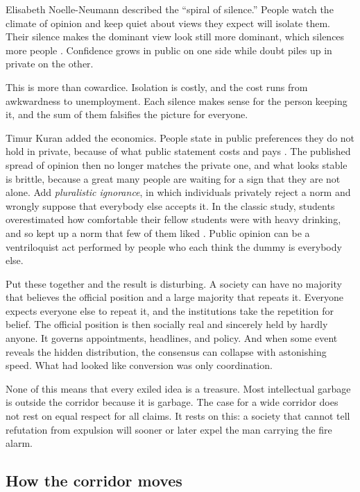 \documentclass[12pt,a4paper]{book}
\begin{document}
Elisabeth Noelle-Neumann described the ``spiral of silence.'' People watch the climate of opinion and keep quiet about views they expect will isolate them. Their silence makes the dominant view look still more dominant, which silences more people \cite{Noelle-Neumann}. Confidence grows in public on one side while doubt piles up in private on the other.

This is more than cowardice. Isolation is costly, and the cost runs from awkwardness to unemployment. Each silence makes sense for the person keeping it, and the sum of them falsifies the picture for everyone.

Timur Kuran added the economics. People state in public preferences they do not hold in private, because of what public statement costs and pays \cite{Kuran1995}. The published spread of opinion then no longer matches the private one, and what looks stable is brittle, because a great many people are waiting for a sign that they are not alone. Add \emph{pluralistic ignorance}, in which individuals privately reject a norm and wrongly suppose that everybody else accepts it. In the classic study, students overestimated how comfortable their fellow students were with heavy drinking, and so kept up a norm that few of them liked \cite{PrenticeMiller1993}. Public opinion can be a ventriloquist act performed by people who each think the dummy is everybody else.

Put these together and the result is disturbing. A society can have no majority that believes the official position and a large majority that repeats it. Everyone expects everyone else to repeat it, and the institutions take the repetition for belief. The official position is then socially real and sincerely held by hardly anyone. It governs appointments, headlines, and policy. And when some event reveals the hidden distribution, the consensus can collapse with astonishing speed. What had looked like conversion was only coordination.

None of this means that every exiled idea is a treasure. Most intellectual garbage is outside the corridor because it is garbage. The case for a wide corridor does not rest on equal respect for all claims. It rests on this: a society that cannot tell refutation from expulsion will sooner or later expel the man carrying the fire alarm.

\subsection{How the corridor moves}
\end{document}
